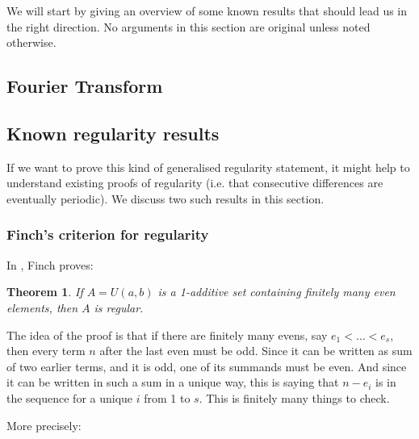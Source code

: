 \documentclass{article}
\newtheorem{theorem}{Theorem}[section]
\theoremstyle{definition}
\theoremstyle{remark}
\numberwithin{equation}{section}
\begin{document}
We will start by giving an overview of some known results that should
lead us in the right direction.  No arguments in this section are
original unless noted otherwise.

{\color{red}

\subsection{Fourier Transform}

}

\subsection{Known regularity results}

If we want to prove this kind of generalised regularity statement, it
might help to understand existing proofs of regularity (i.e. that
consecutive differences are eventually periodic).  We discuss two such
results in this section.

\subsubsection{Finch's criterion for regularity}

In \cite{finch:em1992}, Finch proves:

\begin{theorem}
If $A = U(a,b)$ is a 1-additive set containing finitely many even
elements, then $A$ is regular.  
\end{theorem}

The idea of the proof is that if there are finitely many evens, say
$e_1 < \ldots < e_s$, then every term $n$ after the last even must be
odd.  Since it can be written as sum of two earlier terms, and it is
odd, one of its summands must be even.  And since it can be written in
such a sum in a unique way, this is saying that $n - e_i$ is in the
sequence for a unique $i$ from 1 to $s$.  This is finitely many things
to check.

More precisely:
\end{document}
